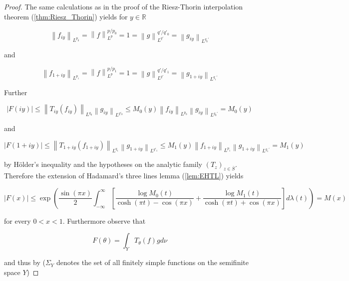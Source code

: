 \begin{proof}
	The same calculations as in the proof of the Riesz-Thorin interpolation theorem (\ref{thm:Riesz_Thorin}) yields for $y \in \mathbb{R}$

	\begin{equation*}
		\left\| f_{iy}\right\|_{L^{p_0}} = \left\| f\right\|^{p/p_0}_{L^p} = 1 = \left\| g\right\|_{L^{q'}}^{q'/q'_0} = \left\| g_{iy}\right\|_{L^{q_0'}}
	\end{equation*}

	and

	\begin{equation*}
		\left\| f_{1 + iy}\right\|_{L^{p_1}} = \left\| f\right\|^{p/p_1}_{L^p} = 1 = \left\| g\right\|_{L^{q'}}^{q'/q'_1} = \left\| g_{1 + iy}\right\|_{L^{q_1'}}
	\end{equation*}

	Further

	\begin{equation*}
		\left| F(iy)\right| \leq \left\| T_{iy}(f_{iy})\right\|_{L^{q_0}} \left\| g_{iy}\right\|_{L^{q'_0}} \leq M_0(y) \left\|f_{iy}\right\|_{L^{p_0}}\left\| g_{iy}\right\|_{L^{q_0'}} = M_0(y)
	\end{equation*}

	and

	\begin{equation*}
		\left| F(1 + iy)\right| \leq \left\| T_{1 + iy}(f_{1 + iy})\right\|_{L^{q_1}} \left\| g_{1 + iy}\right\|_{L^{q'_1}} \leq M_1(y) \left\|f_{1 + iy}\right\|_{L^{p_1}}\left\| g_{1 + iy}\right\|_{L^{q_1'}} = M_1(y)
	\end{equation*}

	by H\"older's inequality and the hypotheses on the analytic family $(T_z)_{z \in \overline{S}}$. Therefore the extension of Hadamard's three lines lemma (\ref{lem:EHTL}) yields

	\begin{equation*}
		\left| F(x) \right| \leq \exp\left( \frac{\sin(\pi x)}{2} \int_{-\infty}^\infty \left[ \frac{\log M_0(t)}{\cosh(\pi t) - \cos(\pi x)} + \frac{\log M_1(t)}{\cosh(\pi t) + \cos(\pi x)}\right] d\lambda(t) \right) = M(x)
	\end{equation*}

	for every $0 < x < 1$. Furthermore observe that

	\begin{equation*}
		F(\theta) = \int_Y T_\theta(f)gd\nu
	\end{equation*}

	and thus by \cite[189]{folland:real_analysis:1999} ($\Sigma_Y$ denotes the set of all finitely simple functions on the semifinite space $Y$)


\end{proof}
